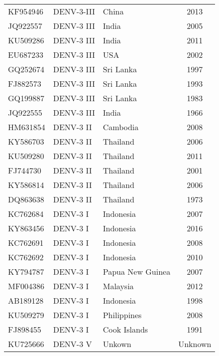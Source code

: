 \begin{scriptsize}
\begin{center}
\begin{longtable}{@{}lllc@{}}
KF954946 & DENV-3-III          & China            & 2013            \\
JQ922557 & DENV-3 III          & India            & 2005            \\
KU509286 & DENV-3 III          & India            & 2011            \\
EU687233 & DENV-3 III          & USA              & 2002            \\
GQ252674 & DENV-3 III          & Sri Lanka        & 1997            \\
FJ882573 & DENV-3 III          & Sri Lanka        & 1993            \\
GQ199887 & DENV-3 III          & Sri Lanka        & 1983            \\
JQ922555 & DENV-3 III          & India            & 1966            \\
HM631854 & DENV-3 II           & Cambodia         & 2008            \\
KY586703 & DENV-3 II           & Thailand         & 2006            \\
KU509280 & DENV-3 II           & Thailand         & 2011            \\
FJ744730 & DENV-3 II           & Thailand         & 2001            \\
KY586814 & DENV-3 II           & Thailand         & 2006            \\
DQ863638 & DENV-3 II           & Thailand         & 1973            \\
KC762684 & DENV-3 I            & Indonesia        & 2007            \\
KY863456 & DENV-3 I            & Indonesia        & 2016            \\
KC762691 & DENV-3 I            & Indonesia        & 2008            \\
KC762692 & DENV-3 I            & Indonesia        & 2010            \\
KY794787 & DENV-3 I            & Papua New Guinea & 2007            \\
MF004386 & DENV-3 I            & Malaysia         & 2012            \\
AB189128 & DENV-3 I            & Indonesia        & 1998            \\
KU509279 & DENV-3 I            & Philippines      & 2008            \\
FJ898455 & DENV-3 I            & Cook Islands     & 1991            \\
KU725666 & DENV-3 V            & Unkown           & Unknown        
\end{longtable}

\end{center}
\end{scriptsize}
